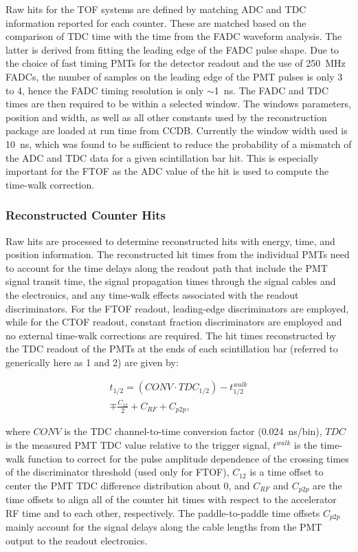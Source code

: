 Raw hits for the TOF systems are defined by matching ADC and TDC information reported for each counter. These
are matched based on the comparison of TDC time with the time from the FADC waveform analysis. The latter is
derived from fitting the leading edge of the FADC pulse shape. Due to the choice of fast timing PMTs for the
detector readout and the use of 250~MHz FADCs, the number of samples on the leading edge of the PMT pulses is
only 3 to 4, hence the FADC timing resolution is only $\sim$1~ns. The FADC and TDC times are then required to be
within a selected window. The windows parameters, position and width, as well as all other constants used by the
reconstruction package are loaded at run time from CCDB. Currently the window width used is 10~ns, which was
found to be sufficient to reduce the probability of a mismatch of the ADC and TDC data for a given scintillation bar
hit. This is especially important for the FTOF as the ADC value of the hit is used to compute the time-walk
correction.

\subsubsection{Reconstructed Counter Hits}
\label{rec:hits}

Raw hits are processed to determine reconstructed hits with energy, time, and position information.  The
reconstructed hit times from the individual PMTs need to account for the time delays along the readout path
that include the PMT signal transit time, the signal propagation times through the signal cables and the electronics,
and any time-walk effects associated with the readout discriminators. For the FTOF readout, leading-edge
discriminators are employed, while for the CTOF readout, constant fraction discriminators are employed and no
external time-walk corrections are required. The hit times reconstructed by the TDC readout of the PMTs at the
ends of each scintillation bar (referred to generically here as 1 and 2) are given by:

\begin{multline}
t_{1/2} = (CONV \cdot TDC_{1/2}) - t_{1/2}^{walk} \\ \mp \frac{C_{12}}{2} + C_{RF} + C_{p2p},
\end{multline}

\noindent
where $CONV$ is the TDC channel-to-time conversion factor (0.024~ns/bin), $TDC$ is the measured PMT TDC
value relative to the trigger signal, $t^{walk}$ is the time-walk function to correct for the pulse amplitude
dependence of the crossing times of the discriminator threshold (used only for FTOF), $C_{12}$ is a time offset
to center the PMT TDC difference distribution about 0, and $C_{RF}$ and $C_{p2p}$ are the time offsets to
align all of the counter hit times with respect to the accelerator RF time and to each other, respectively. The
paddle-to-paddle time offsets $C_{p2p}$ mainly account for the signal delays along the cable lengths from the PMT
output to the readout electronics.

